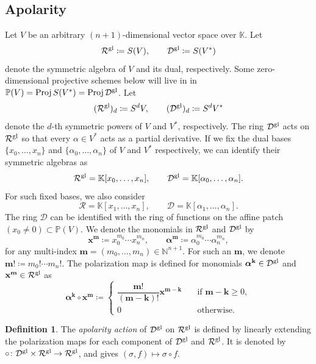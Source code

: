 \documentclass[a4paper,11pt,reqno]{amsart}
\newcommand{\bfk}{\mathbf{k}}
\newcommand{\bfm}{\mathbf{m}}
\newcommand{\bfx}{\mathbf{x}}
\newcommand{\calD}{\mathcal{D}}
\newcommand{\calR}{\mathcal{R}}
\newcommand{\bbK}{\mathbb{K}}
\newcommand{\bbN}{\mathbb{N}}
\newcommand{\bfalpha}{\boldsymbol{\alpha}}
\DeclareMathOperator{\Proj}{Proj}
\newcommand{\jjintodo}[1]{\todo[inline,color=blue!40,bordercolor=blue,size=\footnotesize]{\textbf{TODO: }#1}}
\newcommand{\oldtext}[1]{\textcolor{darkelectricblue}{#1}}
\newcommand{\cfchange}[1]{\textcolor{blue}{#1}}
\numberwithin{equation}{section}
\theoremstyle{definition}
\newtheorem{defn}[equation]{Definition}
\theoremstyle{plain}
\theoremstyle{remark}
\newcommand{\calDgl}{\calD^{\rm{gl}}}
\newcommand{\calRgl}{\calR^{\rm{gl}}}
\begin{document}
\subsection{Apolarity} \noindent Let $V$ be an arbitrary $(n+1)$-dimensional vector space over $\bbK$.
Let
\[
\calRgl\coloneq S(V),\qquad \calDgl\coloneq S(V^*)
\]
denote the symmetric algebra of $V$ and its dual, respectively.
 {Some zero-dimensional projective schemes below will live in in $\mathbb{P}(V) = \Proj S(V^*) = \Proj \calDgl$.}
Let
\[ (\calRgl)_{d}\coloneq S^d V,\qquad(\calDgl)_{d}\coloneq S^d V^*\] denote the $d$-th symmetric powers of $V$ and $V^*$, respectively.
The ring $\calDgl$ acts on $\calRgl$ so that every $\alpha\in V^*$ acts as a
partial derivative.
If we fix the dual bases $\{x_0,\dots,x_n\}$ and $\{\alpha_0,\dots,\alpha_n\}$ of $V$ and $V^*$ respectively, we can identify their symmetric algebras as
\[
\calRgl=\bbK[x_{0},\dots,x_{n}],\qquad \calDgl=\bbK[\alpha_{0},\dots,\alpha_{n}].
\]
{For such fixed bases, we also consider}
\[
\calR=\bbK[x_{1},\dots,x_{n}],\qquad \calD=\bbK[\alpha_{1},\dots,\alpha_{n}].
\]
{The ring $\calD$ can be identified with the ring of functions on the affine patch $(x_0\neq 0) \subset \mathbb{P}(V)$.}
We denote the monomials in $\calRgl$ and $\calDgl$ by
\[
\bfx^{\bfm}\coloneq x_0^{m_0}\cdots x_n^{m_n},\qquad \bfalpha^{\bfm}\coloneq\alpha_0^{m_0}\cdots \alpha_n^{m_n},
\]
for any multi-index $\bfm=(m_0,\dots,m_n)\in\bbN^{n+1}$. For such an $\bfm$, {we denote}
$\bfm!\coloneq m_0!\cdots m_n!$.
The polarization map is defined for monomials $\bfalpha^{\bfk}\in\calDgl$ and $\bfx^{\bfm}\in\calRgl$ as
\[
\bfalpha^{\bfk}\circ\bfx^{\bfm}\coloneq
\begin{cases}
\dfrac{\bfm!}{(\bfm-\bfk)!}\bfx^{\bfm-\bfk}\quad &\text{if $\bfm-\bfk\geq 0$},\\[2ex]
0\quad &\text{otherwise}.
\end{cases}
\]
\begin{defn}
\label{defn:apolarity_action}
The \textit{apolarity action} of $\calDgl$ on $\calRgl$ is defined by linearly extending
the polarization maps for each component of $\calDgl$ and $\calRgl$. It is denoted by $\circ\colon \calDgl\times\calRgl\to\calRgl$, and gives $(\sigma, f)\mapsto
\sigma\circ f$.
\end{defn}
\end{document}
